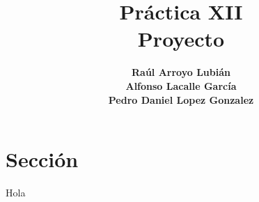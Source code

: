 \documentclass[a4paper,11pt]{article}
\title
{
    \textbf{Práctica XII}\\
    \textbf{Proyecto}
}
\author
{
 	\textbf{Raúl Arroyo Lubián}\\
    \textbf{Alfonso Lacalle García}\\
    \textbf{Pedro Daniel Lopez Gonzalez}
}
\begin{document}
	\maketitle
	\newpage
	\tableofcontents
	\newpage
	\section{Sección}
    Hola
\end{document}
